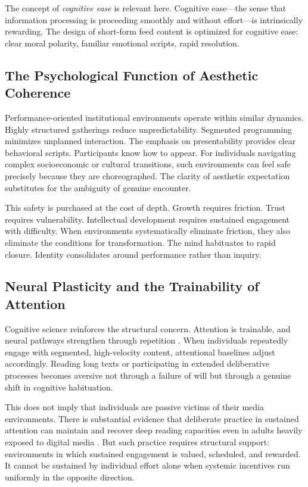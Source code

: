 \documentclass[12pt]{article}
\theoremstyle{definition}
\theoremstyle{plain}
\begin{document}
The concept of \emph{cognitive ease} \citep{Kahneman2011} is relevant here. Cognitive ease---the sense that information processing is proceeding smoothly and without effort---is intrinsically rewarding. The design of short-form feed content is optimized for cognitive ease: clear moral polarity, familiar emotional scripts, rapid resolution.

\subsection{The Psychological Function of Aesthetic Coherence}

Performance-oriented institutional environments operate within similar dynamics. Highly structured gatherings reduce unpredictability. Segmented programming minimizes unplanned interaction. The emphasis on presentability provides clear behavioral scripts. Participants know how to appear. For individuals navigating complex socioeconomic or cultural transitions, such environments can feel safe precisely because they are choreographed. The clarity of aesthetic expectation substitutes for the ambiguity of genuine encounter.

This safety is purchased at the cost of depth. Growth requires friction. Trust requires vulnerability. Intellectual development requires sustained engagement with difficulty. When environments systematically eliminate friction, they also eliminate the conditions for transformation. The mind habituates to rapid closure. Identity consolidates around performance rather than inquiry.

\subsection{Neural Plasticity and the Trainability of Attention}

Cognitive science reinforces the structural concern. Attention is trainable, and neural pathways strengthen through repetition \citep{Carr2010, Wolf2018}. When individuals repeatedly engage with segmented, high-velocity content, attentional baselines adjust accordingly. Reading long texts or participating in extended deliberative processes becomes aversive not through a failure of will but through a genuine shift in cognitive habituation.

This does not imply that individuals are passive victims of their media environments. There is substantial evidence that deliberate practice in sustained attention can maintain and recover deep reading capacities even in adults heavily exposed to digital media \citep{Wolf2018}. But such practice requires structural support: environments in which sustained engagement is valued, scheduled, and rewarded. It cannot be sustained by individual effort alone when systemic incentives run uniformly in the opposite direction.
\end{document}
